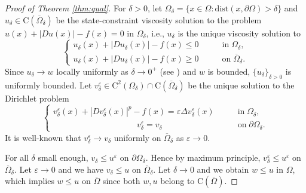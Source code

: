 \documentclass[11pt,reqno]{amsart}
\numberwithin{figure}{section}
\theoremstyle{plain}
\theoremstyle{remark}
\numberwithin{equation}{section}
\newcommand{\rmC}{\mathrm{C}}
\begin{document}
\begin{proof}[Proof of Theorem \ref{thm:qual}]
For $\delta>0$, let $\Omega_\delta = \{x\in \Omega: \mathrm{dist}(x,\partial \Omega) > \delta\}$ and $u_\delta\in\rmC(\overline{\Omega}_\delta)$ be the state-constraint viscosity solution to the problem $  u(x) + |Du(x)| - f(x) = 0$ in $\Omega_\delta$, i.e., $u_\delta$ is the unique viscosity solution to
\begin{equation}\label{e:v_v}
    \begin{cases}
      u_\delta(x) + |Du_\delta(x)|-f(x) \leq 0 &\qquad\text{in}\;\Omega_\delta,\\
      u_\delta(x) + |Du_\delta(x)| - f(x) \geq 0 &\qquad\text{on}\;\overline{\Omega}_\delta.
    \end{cases}
\end{equation}
Since $u_\delta\rightarrow w$ locally uniformly as $\delta\rightarrow 0^+$ (see \cite{kim_state-constraint_2020}) and $w$ is bounded, $\{u_\delta\}_{\delta>0}$ is uniformly bounded. Let $v^\varepsilon_\delta\in \rmC^2(\Omega_\delta)\cap \rmC(\overline{\Omega}_\delta)$ be the unique solution to the Dirichlet problem
\begin{equation}\label{eq:vv_eps}
\begin{cases}
      v_\delta^\varepsilon(x) + |Dv_\delta^\varepsilon(x)|^p - f(x) = \varepsilon \Delta v_\delta^\varepsilon(x) &\qquad\text{in}\;\Omega_\delta,\\
    \;\;\;\,\quad\qquad\qquad\qquad\qquad v_\delta^\varepsilon = v_\delta &\qquad \text{on}\;\partial\Omega_\delta.
\end{cases}
\end{equation}
It is well-known that $v^\varepsilon_\delta\to v_\delta$ uniformly on $\overline{\Omega}_\delta$ as $\varepsilon\to 0$.

For all $\delta$ small enough, $v_\delta\leq u^\varepsilon$ on $\partial \Omega_\delta$. Hence by maximum principle, $v^\varepsilon_\delta \leq u^\varepsilon$ on $\overline{\Omega}_\delta$. Let $\varepsilon\to 0$ and we have $v_\delta \leq u$ on $\overline{\Omega}_\delta$.
Let $\delta\rightarrow 0$ and we obtain $w\leq u$ in $\Omega$, which implies $w\leq u$ on $\overline{\Omega}$ since both $w,u$ belong to $\rmC(\overline{\Omega})$.
\end{proof}
\end{document}
